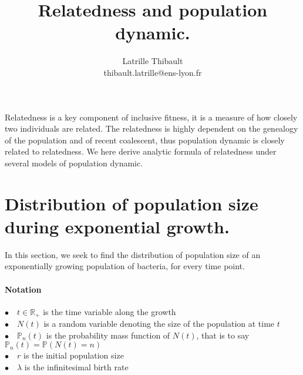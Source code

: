 \documentclass{article}
\author{Latrille Thibault\\
\small thibault.latrille@ens-lyon.fr\\[-0.8ex]}
\title{Relatedness and population dynamic.}
\newcommand{\pr}{{\mathbb{P}}}
\begin{document}
\maketitle

Relatedness is a key component of inclusive fitness, it is a measure of how closely two individuals are related. The relatedness is highly dependent on the genealogy of the population and of recent coalescent, thus population dynamic is closely related to relatedness. We here derive analytic formula of relatedness under several models of population dynamic. 

\section{Distribution of population size during exponential growth.}

In this section, we seek to find the distribution of population size of an exponentially growing population of bacteria, for every time point.
 \paragraph{Notation} $ $\\
 $\bullet \quad t \in \mathbb{R}_+$ is the time variable along the growth\\
 $\bullet \quad N(t)$ is a random variable denoting the size of the population at time $t$\\
 $\bullet \quad \pr_n(t)$ is the probability mass function of $N(t)$, that is to say $\pr_n(t)=\pr (N(t)=n)$\\
 $\bullet \quad r$ is the initial population size\\
 $\bullet \quad \lambda$ is the infinitesimal birth rate\\
 
\end{document}
